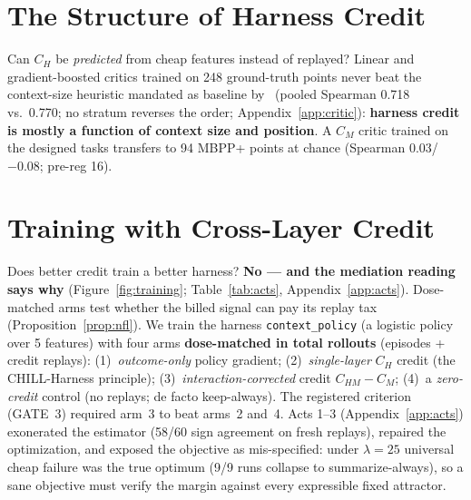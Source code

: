 \documentclass{article}
\theoremstyle{remark}
\begin{document}
\section{The Structure of Harness Credit}
\label{sec:critic}
Can $C_H$ be \emph{predicted} from cheap features instead of replayed?
Linear and gradient-boosted critics trained on 248 ground-truth points
never beat the context-size heuristic mandated as baseline
by~\citep{audit2026} (pooled Spearman 0.718 vs.\ 0.770; no stratum
reverses the order; Appendix~\ref{app:critic}): \textbf{harness credit
is mostly a function of context size and position}. A $C_M$ critic
trained on the designed tasks transfers to 94 MBPP+ points at chance
(Spearman $0.03$/$-0.08$; pre-reg 16).

\section{Training with Cross-Layer Credit}
\label{sec:training}
Does better credit train a better harness? \textbf{No --- and the
mediation reading says why} (Figure~\ref{fig:training};
Table~\ref{tab:acts}, Appendix~\ref{app:acts}). Dose-matched arms test
whether the billed signal can pay its replay tax
(Proposition~\ref{prop:nfl}). We train the harness
\texttt{context\_policy} (a logistic policy over 5 features) with four
arms \textbf{dose-matched in total rollouts} (episodes + credit replays):
(1)~\emph{outcome-only} policy gradient; (2)~\emph{single-layer} $C_H$
credit (the CHILL-Harness principle); (3)~\emph{interaction-corrected}
credit $C_{HM} - C_M$; (4)~a \emph{zero-credit} control (no replays; de
facto keep-always). The registered criterion (GATE~3) required arm~3 to
beat arms~2 and~4.
Acts 1--3 (Appendix~\ref{app:acts}) exonerated the estimator (58/60
sign agreement on fresh replays), repaired the optimization, and exposed
the objective as mis-specified: under $\lambda = 25$ universal cheap
failure was the true optimum (9/9 runs collapse to summarize-always), so
a sane objective must verify the margin against every expressible fixed
attractor.
\end{document}

